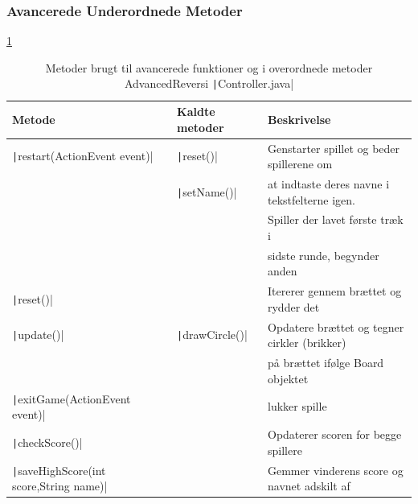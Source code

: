 \subsubsection{Avancerede Underordnede Metoder}
\cref{tbl:2}
\begin{table}[H]
    \centering
    \caption{Metoder brugt til avancerede funktioner og i overordnede metoder AdvancedReversi \texttt|Controller.java|}\label{tbl:2}
    \begin{tabular}{lll}
        \toprule
        Metode                                                  & Kaldte metoder                     & Beskrivelse                                               \\
        \midrule
        \texttt|restart(ActionEvent event)|           & \texttt|reset()|         & Genstarter spillet og beder spillerene om                 \\
                                                                & \texttt|setName()|       & at indtaste deres navne i tekstfelterne igen.             \\
                                                                &                                    & Spiller der lavet første træk i                           \\
                                                                &                                    & sidste runde, begynder anden                              \\
        \texttt|reset()|                              &                                    & Itererer gennem brættet og rydder det                     \\
        \texttt|update()|                             & \texttt|drawCircle()|    & Opdatere brættet og tegner cirkler (brikker)              \\
                                                                &                                    & på brættet ifølge Board objektet                          \\
        \texttt|exitGame(ActionEvent event)|          &                                    & lukker spille                                             \\
        \texttt|checkScore()|                         &                                    & Opdaterer scoren for begge spillere                       \\
        \texttt|saveHighScore(int score,String name)| &                                    & Gemmer vinderens score og navnet adskilt af               \\

\end{tabular}
\end{table}

